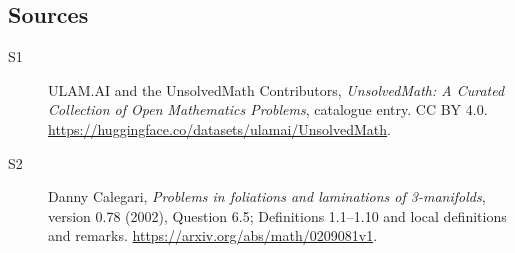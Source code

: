 \documentclass[11pt]{article}
\begin{document}
\subsection{Sources}
\begin{description}
\item[\hypertarget{source:statement:1}{S1}] ULAM.AI and the UnsolvedMath Contributors, \emph{UnsolvedMath: A Curated Collection of Open Mathematics Problems}, catalogue entry. CC BY 4.0. \url{https://huggingface.co/datasets/ulamai/UnsolvedMath}.
\item[\hypertarget{source:statement:2}{S2}] Danny Calegari, \emph{Problems in foliations and laminations of 3-manifolds}, version 0.78 (2002), Question 6.5; Definitions 1.1--1.10 and local definitions and remarks. \url{https://arxiv.org/abs/math/0209081v1}.
\end{description}
\label{end:statement}
\end{document}

